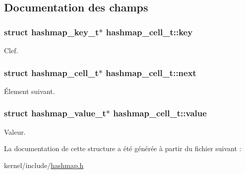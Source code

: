 \subsection{Documentation des champs}
\hypertarget{structhashmap__cell__t_a18fa668e172072e9bff5e92e52d9f3af}{
\subsubsection[{key}]{\setlength{\rightskip}{0pt plus 5cm}struct hashmap\+\_\+key\+\_\+t$\ast$ hashmap\+\_\+cell\+\_\+t\+::key}}\label{structhashmap__cell__t_a18fa668e172072e9bff5e92e52d9f3af}
Clef. \hypertarget{structhashmap__cell__t_afea1a8c217d80c95efa5b4a89ea07bf2}{
\subsubsection[{next}]{\setlength{\rightskip}{0pt plus 5cm}struct {\bf hashmap\+\_\+cell\+\_\+t}$\ast$ hashmap\+\_\+cell\+\_\+t\+::next}}\label{structhashmap__cell__t_afea1a8c217d80c95efa5b4a89ea07bf2}
Élement suivant. \hypertarget{structhashmap__cell__t_aa0758cf139adb3747a846e539d01d75d}{
\subsubsection[{value}]{\setlength{\rightskip}{0pt plus 5cm}struct hashmap\+\_\+value\+\_\+t$\ast$ hashmap\+\_\+cell\+\_\+t\+::value}}\label{structhashmap__cell__t_aa0758cf139adb3747a846e539d01d75d}
Valeur. 

La documentation de cette structure a été générée à partir du fichier suivant \+:\begin{DoxyCompactItemize}
\item 
kernel/include/\hyperlink{hashmap_8h}{hashmap.\+h}\end{DoxyCompactItemize}
